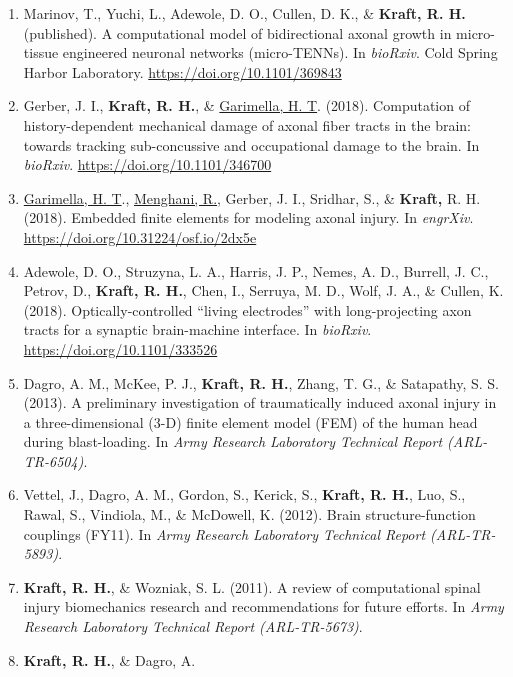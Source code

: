 \documentclass[11pt]{article}
\begin{document}
\begin{enumerate}
\def\labelenumi{\arabic{enumi}.}
\item
  Marinov, T., Yuchi, L., Adewole, D. 
O., Cullen, D. 
K., \& \textbf{\textbf{Kraft,} R. 
H.}
  (published). 
A computational model of bidirectional axonal growth in
  micro-tissue engineered neuronal networks (micro-TENNs). 
In
  \emph{bioRxiv}. 
Cold Spring Harbor Laboratory.
  \url{https://doi.org/10.1101/369843}
\item
  Gerber, J. 
I., \textbf{\textbf{Kraft,} R. 
H.}, \& \underline{Garimella, H. 
T}. 
(2018). 
Computation
  of history-dependent mechanical damage of axonal fiber tracts in the
  brain: towards tracking sub-concussive and occupational damage to the
  brain. 
In \emph{bioRxiv}. 
\url{https://doi.org/10.1101/346700}
\item
  \underline{Garimella, H. 
T}., \underline{Menghani, R.}, Gerber, J. 
I., Sridhar, S., \& \textbf{Kraft,}
  R. 
H. 
(2018). 
Embedded finite elements for modeling axonal injury. 
In
  \emph{engrXiv}. 
\url{https://doi.org/10.31224/osf.io/2dx5e}
\item
  Adewole, D. 
O., Struzyna, L. 
A., Harris, J. 
P., Nemes, A. 
D., Burrell,
  J. 
C., Petrov, D., \textbf{\textbf{Kraft,} R. 
H.}, Chen, I., Serruya, M. 
D., Wolf, J.
  A., \& Cullen, K. 
(2018). 
Optically-controlled ``living electrodes''
  with long-projecting axon tracts for a synaptic brain-machine
  interface. 
In \emph{bioRxiv}. 
\url{https://doi.org/10.1101/333526}
\item
  Dagro, A. 
M., McKee, P. 
J., \textbf{\textbf{Kraft,} R. 
H.}, Zhang, T. 
G., \& Satapathy,
  S. 
S. 
(2013). 
A preliminary investigation of traumatically induced
  axonal injury in a three-dimensional (3-D) finite element model (FEM)
  of the human head during blast-loading. 
In \emph{Army Research
  Laboratory Technical Report (ARL-TR-6504)}.
\item
  Vettel, J., Dagro, A. 
M., Gordon, S., Kerick, S., \textbf{\textbf{Kraft,} R. 
H.}, Luo,
  S., Rawal, S., Vindiola, M., \& McDowell, K. 
(2012). 
Brain
  structure-function couplings (FY11). 
In \emph{Army Research Laboratory
  Technical Report (ARL-TR-5893)}.
\item
  \textbf{\textbf{Kraft,} R. 
H.}, \& Wozniak, S. 
L. 
(2011). 
A review of computational
  spinal injury biomechanics research and recommendations for future
  efforts. 
In \emph{Army Research Laboratory Technical Report
  (ARL-TR-5673)}.
\item
  \textbf{\textbf{Kraft,} R. 
H.}, \& Dagro, A. 

\end{enumerate}
\end{document}

